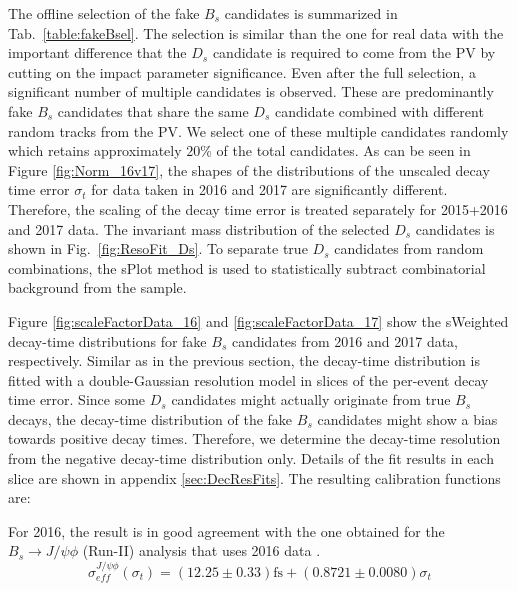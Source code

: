 The offline selection of the fake $B_s$ candidates is summarized in Tab.~\ref{table:fakeBsel}.
The selection is similar than the one for real data with the important difference that the $D_s$ candidate is required to come from the PV by cutting on the impact parameter significance.
Even after the full selection, a significant number of multiple candidates is observed.
These are predominantly fake $B_s$ candidates that share the same $D_s$ candidate combined with different random tracks from the PV.
We select one of these multiple candidates randomly which retains approximately $20\%$ of the total candidates.
As can be seen in Figure \ref{fig:Norm_16v17}, the shapes of the distributions of the unscaled decay time error $\sigma_{t}$ for data taken in 2016 and 2017 are significantly different. 
Therefore, the scaling of the decay time error is treated separately for 2015+2016 and 2017 data.
The invariant mass distribution of the selected $D_s$ candidates is shown in Fig.~\ref{fig:ResoFit_Ds}.
To separate true $D_s$ candidates from random combinations, the \textsf{sPlot} method is used to statistically subtract combinatorial background from the sample.

Figure \ref{fig:scaleFactorData_16} and \ref{fig:scaleFactorData_17} show the \textsf{sWeighted} decay-time distributions for fake $B_s$ candidates from 2016 and 2017 data, respectively.
Similar as in the previous section, the decay-time distribution is fitted with a double-Gaussian resolution model in slices of the per-event decay time error.
Since some $D_s$ candidates might actually originate from true $B_s$ decays, the decay-time distribution of the fake $B_s$ candidates 
might show a bias towards positive decay times. 
Therefore, we determine the decay-time resolution from the negative decay-time distribution only.
Details of the fit results in each slice are shown in appendix \ref{sec:DecResFits}. 
The resulting calibration functions are:


For 2016, the result is in good agreement with the one obtained for the $B_s \to J/\psi \phi$ (Run-II) analysis that uses 2016 data \cite{LHCb-ANA-2017-028}. 
\begin{equation}
\sigma_{eff}^{J/\psi\phi}(\sigma_t) = \left( 12.25 \pm 0.33 \right) \text{fs} + \left( 0.8721 \pm 0.0080 \right) \sigma_t
\label{eq:scaleFactorJpsiPhi}
\end{equation}

